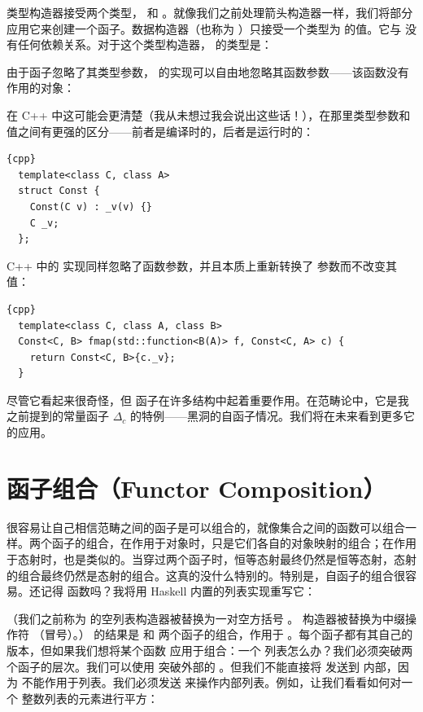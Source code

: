  类型构造器接受两个类型， 和 。就像我们之前处理箭头构造器一样，我们将部分应用它来创建一个函子。数据构造器（也称为 ）只接受一个类型为  的值。它与  没有任何依赖关系。对于这个类型构造器， 的类型是：

由于函子忽略了其类型参数， 的实现可以自由地忽略其函数参数——该函数没有作用的对象：

在 C++ 中这可能会更清楚（我从未想过我会说出这些话！），在那里类型参数和值之间有更强的区分——前者是编译时的，后者是运行时的：

\begin{lstlisting}{cpp}
  template<class C, class A>
  struct Const {
    Const(C v) : _v(v) {}
    C _v;
  };
\end{lstlisting}
C++ 中的  实现同样忽略了函数参数，并且本质上重新转换了  参数而不改变其值：

\begin{lstlisting}{cpp}
  template<class C, class A, class B>
  Const<C, B> fmap(std::function<B(A)> f, Const<C, A> c) {
    return Const<C, B>{c._v};
  }
\end{lstlisting}
尽管它看起来很奇怪，但  函子在许多结构中起着重要作用。在范畴论中，它是我之前提到的常量函子 $\Delta_c$ 的特例——黑洞的自函子情况。我们将在未来看到更多它的应用。

\section{函子组合（Functor Composition）}

很容易让自己相信范畴之间的函子是可以组合的，就像集合之间的函数可以组合一样。两个函子的组合，在作用于对象时，只是它们各自的对象映射的组合；在作用于态射时，也是类似的。当穿过两个函子时，恒等态射最终仍然是恒等态射，态射的组合最终仍然是态射的组合。这真的没什么特别的。特别是，自函子的组合很容易。还记得  函数吗？我将用 Haskell 内置的列表实现重写它：

（我们之前称为  的空列表构造器被替换为一对空方括号 \code{{[}{]}}。 构造器被替换为中缀操作符 \code{:}（冒号）。） 的结果是  和 \code{{[}{]}} 两个函子的组合，作用于 。每个函子都有其自己的  版本，但如果我们想将某个函数  应用于组合：一个  列表怎么办？我们必须突破两个函子的层次。我们可以使用  突破外部的 。但我们不能直接将  发送到  内部，因为  不能作用于列表。我们必须发送  来操作内部列表。例如，让我们看看如何对一个  整数列表的元素进行平方：

